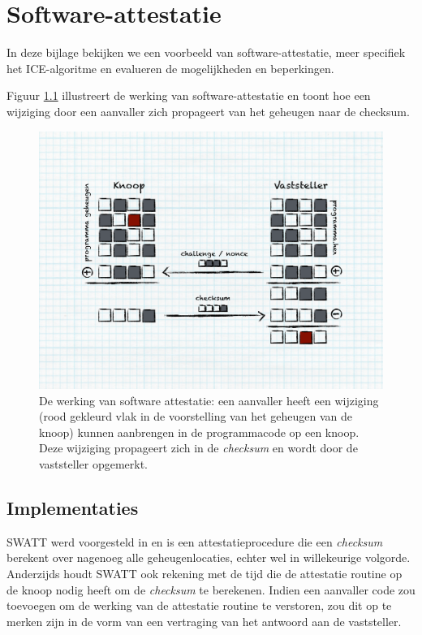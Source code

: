 
\chapter{Software-attestatie}
\label{appendix:attestation}

In deze bijlage bekijken we een voorbeeld van software-attestatie, meer
specifiek het ICE-algoritme en evalueren de mogelijkheden en beperkingen.

Figuur \ref{fig:attestation-process} illustreert de werking van
software-attestatie en toont hoe een wijziging door een aanvaller zich
propageert van het geheugen naar de checksum.

\begin{figure}[ht] \centering
\includegraphics[width=0.9\linewidth]{resources/attestation-process.pdf}
\caption[De werking van software-attestatie]{De werking van software
attestatie: een aanvaller heeft een wijziging (rood gekleurd vlak in de
voorstelling van het geheugen van de knoop) kunnen aanbrengen in de
programmacode op een knoop. Deze wijziging propageert zich in de
\emph{checksum} en wordt door de vaststeller opgemerkt.}
\label{fig:attestation-process} \end{figure}

\section{Implementaties}

SWATT werd voorgesteld in \citep{seshadri2004swatt} en is een
attestatieprocedure die een \emph{checksum} berekent over nagenoeg alle
geheugenlocaties, echter wel in willekeurige volgorde. Anderzijds houdt SWATT
ook rekening met de tijd die de attestatie routine op de knoop nodig heeft om
de \emph{checksum} te berekenen. Indien een aanvaller code zou toevoegen om de
werking van de attestatie routine te verstoren, zou dit op te merken zijn in de
vorm van een vertraging van het antwoord aan de vaststeller.

